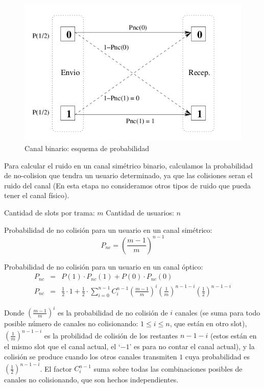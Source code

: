 \documentclass[a4paper,12pt]{article}
\begin{document}
\begin{figure}[t]
  \begin{center}
    \includegraphics[scale=0.43]{canalBinario.png}
  \end{center}
\caption {Canal binario: esquema de probabilidad}
\label{fig:canbin}
\end{figure}

Para calcular el ruido en un canal simétrico binario, calculamos la probabilidad de no-colision que tendra un usuario determinado, ya que las colisiones seran el ruido del canal (En esta etapa no consideramos otros tipos de ruido que pueda tener el canal físico).

\noindent Cantidad de slots por trama: $m$
\noindent Cantidad de usuarios: $n$

\noindent Probabilidad de no colisión para un usuario en un canal simétrico:
\begin{equation}
P_{nc}=\left(\frac{m-1}{m}\right)^{n-1}
\end{equation}


\noindent Probabilidad de no colisión para un usuario en un canal óptico:
\begin{eqnarray}
P_{nc} & = & P(1) \cdot P_{nc}(1) + P(0) \cdot P_{nc}(0) \\
P_{nc} & = & \frac{1}{2} \cdot 1 +  \frac{1}{2} \cdot \sum_{i=0}^{n-1} 
C^{n-1}_{i} \left(\frac{m-1}{m}\right)^i  \left(\frac{1}{m}\right)^{n-1-i}  \left(\frac{1}{2}\right)^{n-1-i} 
\end{eqnarray}

\noindent Donde $\left(\frac{m-1}{m}\right)^i$ es la probabilidad de no
colisión de $i$ canales (se suma para todo posible número de canales no
colisionando: $1\leq i\leq n$, que están en otro slot), $
\left(\frac{1}{m}\right)^{n-1-i}$ es la probilidad de colisión de los restantes
$n-1-i$ (estos están en el mismo slot que el canal actual, el `$-1$' es para no
contar el canal actual), y la colisión se produce cuando los otros canales
transmiten $1$ cuya probabilidad es $\left(\frac{1}{2}\right)^{n-1-i}$. El
factor $C^{n-1}_{i}$ suma sobre todas las combinaciones posibles de canales no
colisionando, que son hechos independientes.
\end{document}
